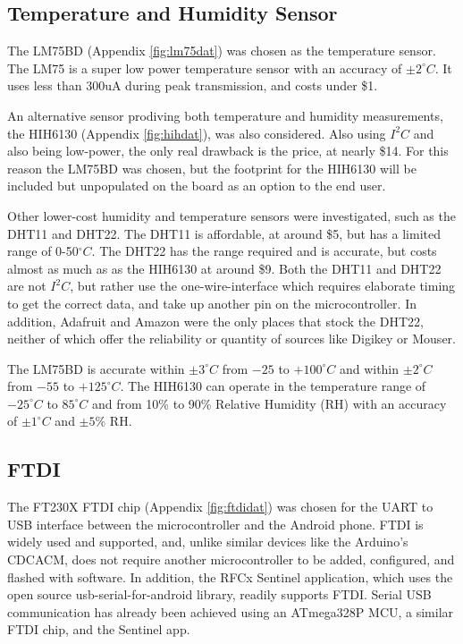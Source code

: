 \documentclass{article}
\numberwithin{figure}{section}
\numberwithin{equation}{section}
\begin{document}
{\subsection{Temperature and Humidity Sensor} \label{sect:temp_just}
The LM75BD (Appendix \ref{fig:lm75dat}) was chosen as the temperature sensor.  The LM75 is a super low power temperature sensor with an accuracy of $\pm2^{\circ}C$. It uses less than 300uA during peak transmission, and costs under \$1.

\bigskip
An alternative sensor prodiving both temperature and humidity measurements, the HIH6130 (Appendix \ref{fig:hihdat}), was also considered. Also using $I^2 C$ and also being low-power, the only real drawback is the price, at nearly \$14. For this reason the LM75BD was chosen, but the footprint for the HIH6130 will be included but unpopulated on the board as an option to the end user.

\bigskip
Other lower-cost humidity and temperature sensors were investigated, such as the DHT11 and DHT22. The DHT11 is affordable, at around \$5, but has a limited range of 0-50$^{\circ}C$. The DHT22 has the range required and is accurate, but costs almost as much as as the HIH6130 at around \$9. Both the DHT11 and DHT22 are not $I^2 C$, but rather use the one-wire-interface which requires elaborate timing to get the correct data, and take up another pin on the microcontroller. In addition, Adafruit and Amazon were the only places that stock the DHT22, neither of which offer the reliability or quantity of sources like Digikey or Mouser.

\bigskip
The LM75BD is accurate within $\pm3^{\circ}C$ from $-25$ to $+100^{\circ}C$ and within $\pm2^{\circ}C$ from $-55$ to $+125^{\circ}C$. The HIH6130 can operate in the temperature range of $-25^{\circ}C$ to $85^{\circ}C$ and from 10\% to 90\% Relative Humidity (RH) with an accuracy of $\pm1^{\circ}C$ and $\pm5$\% RH.

\subsection{FTDI} \label{sect:ftdi_just}
The FT230X FTDI chip (Appendix \ref{fig:ftdidat}) was chosen for the UART to USB interface between the microcontroller and the Android phone. FTDI is widely used and supported, and, unlike similar devices like the Arduino's CDCACM, does not require another microcontroller to be added, configured, and flashed with software. In addition, the RFCx Sentinel application, which uses the open source usb-serial-for-android library, readily supports FTDI. Serial USB communication has already been achieved using an ATmega328P MCU, a similar FTDI chip, and the Sentinel app.

}
\end{document}
